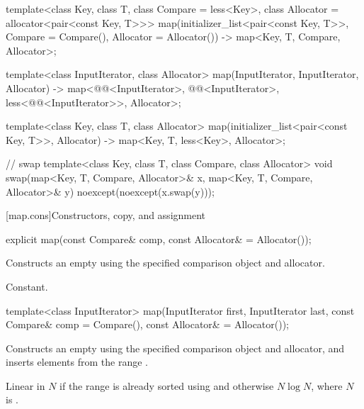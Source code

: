 \begin{codeblock}
{  template<class Key, class T, class Compare = less<Key>,
           class Allocator = allocator<pair<const Key, T>>>
    map(initializer_list<pair<const Key, T>>, Compare = Compare(), Allocator = Allocator())
      -> map<Key, T, Compare, Allocator>;

  template<class InputIterator, class Allocator>
    map(InputIterator, InputIterator, Allocator)
      -> map<@@<InputIterator>, @@<InputIterator>,
             less<@@<InputIterator>>, Allocator>;

  template<class Key, class T, class Allocator>
    map(initializer_list<pair<const Key, T>>, Allocator) -> map<Key, T, less<Key>, Allocator>;

  // swap
  template<class Key, class T, class Compare, class Allocator>
    void swap(map<Key, T, Compare, Allocator>& x,
              map<Key, T, Compare, Allocator>& y)
      noexcept(noexcept(x.swap(y)));
}
\end{codeblock}


[map.cons]{Constructors, copy, and assignment}%
%

%
\begin{itemdecl}
explicit map(const Compare& comp, const Allocator& = Allocator());
\end{itemdecl}

\begin{itemdescr}
\pnum
\effects
Constructs an empty
using the specified comparison object and allocator.

\pnum
\complexity
Constant.
\end{itemdescr}

%
\begin{itemdecl}
template<class InputIterator>
  map(InputIterator first, InputIterator last,
      const Compare& comp = Compare(), const Allocator& = Allocator());
\end{itemdecl}

\begin{itemdescr}
\pnum
\effects
Constructs an empty
using the specified comparison object and allocator,
and inserts elements from the range
.

\pnum
\complexity
Linear in $N$ if the range
is already sorted using 
and otherwise $N \log N$, where $N$
is .
\end{itemdescr}

